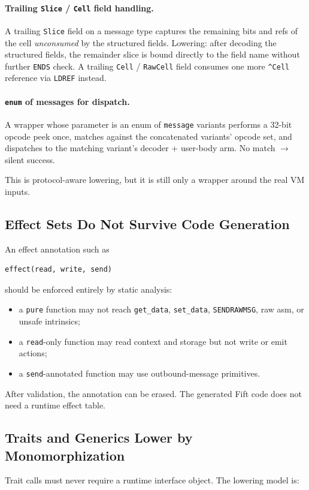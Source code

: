 \documentclass[12pt,oneside]{article}
\begin{document}
\paragraph{Trailing \texttt{Slice} / \texttt{Cell} field handling.}
A trailing \verb|Slice| field on a message type captures the
remaining bits and refs of the cell \emph{unconsumed} by the
structured fields. Lowering: after decoding the structured fields, the
remainder slice is bound directly to the field name without further
\verb|ENDS| check. A trailing \verb|Cell| / \verb|RawCell| field
consumes one more \verb|^Cell| reference via \verb|LDREF| instead.

\paragraph{\texttt{enum} of messages for dispatch.}
A wrapper whose parameter is an enum of \verb|message| variants
performs a 32-bit opcode peek once, matches against the concatenated
variants' opcode set, and dispatches to the matching variant's
decoder + user-body arm. No match $\to$ silent success.

This is protocol-aware lowering, but it is still only a wrapper around
the real VM inputs.

\subsection{Effect Sets Do Not Survive Code Generation}
An effect annotation such as

\begin{verbatim}
effect(read, write, send)
\end{verbatim}

should be enforced entirely by static analysis:

\begin{itemize}
\item a \verb|pure| function may not reach \verb|get_data|, \verb|set_data|,
\verb|SENDRAWMSG|, raw asm, or unsafe intrinsics;
\item a \verb|read|-only function may read context and storage but not write or
emit actions;
\item a \verb|send|-annotated function may use outbound-message primitives.
\end{itemize}

After validation, the annotation can be erased. The generated Fift code does not
need a runtime effect table.

\subsection{Traits and Generics Lower by Monomorphization}
Trait calls must never require a runtime interface object. The lowering model
is:
\end{document}

